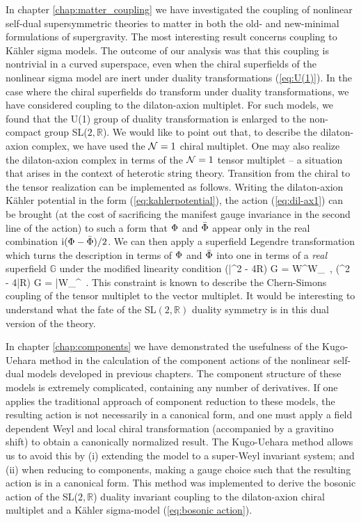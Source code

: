 In chapter \ref{chap:matter_coupling} we have investigated the coupling of nonlinear self-dual supersymmetric theories to matter in both the old- and new-minimal formulations of supergravity. The most interesting result concerns coupling to K{\"a}hler sigma models. The outcome of our analysis was that this coupling is nontrivial in a curved superspace, even when the chiral superfields of the nonlinear sigma model are inert under duality transformations (\ref{eq:U(1)}). In the case where the chiral superfields do transform under duality transformations, we have considered coupling to the dilaton-axion multiplet. For such models, we found that the U(1) group of duality transformation is enlarged to the non-compact group SL($2,{\mathbb R}$). We would like to point out that, to describe the dilaton-axion complex, we have used the ${\cal N}=1$ chiral multiplet. One may also realize the dilaton-axion complex in terms of the ${\cal N}=1$ tensor multiplet -- a situation that arises in the context of heterotic string theory. Transition from the chiral to the tensor realization can be implemented as follows. Writing the dilaton-axion K{\"a}hler potential in the form (\ref{eq:kahlerpotential}), the action (\ref{eq:dil-ax1}) can be brought (at the cost of sacrificing the manifest gauge invariance in the second line of the action) to such a form that  $\Phi$ and $\bar {\Phi}$ appear only in the real combination ${\rm i}(\Phi - \bar {\Phi})/2$. We can then apply a superfield Legendre transformation which turns the description in terms of $\Phi$ and $\bar {\Phi}$ into one in terms of a {\it real} superfield ${\mathbb G}$ under the modified linearity condition
\be
({\bar \cD}^2 - 4R) {\mathbb G} = W^\a W_\a~, \qquad
(\cD^2 - 4{\bar R}) {\mathbb G} = {\bar W}_^\ad~.
\ee
This constraint is known to describe the Chern-Simons coupling of the tensor multiplet to the vector multiplet. It would be interesting to understand what the fate of the SL$(2,{\mathbb R})$ duality symmetry is in this dual version of the theory.

In chapter \ref{chap:components} we have demonstrated the usefulness of the Kugo-Uehara method in the calculation of the component actions of the nonlinear self-dual models developed in previous chapters. The component structure of these models is extremely complicated, containing any number of derivatives. If one applies the traditional approach of component reduction to these models, the resulting action is not necessarily in a canonical form, and one must apply a field dependent Weyl and local chiral transformation (accompanied by a gravitino shift) to obtain a canonically normalized result. The Kugo-Uehara method allows us to avoid this by (i) extending the model to a super-Weyl invariant system; and (ii) when reducing to components, making a gauge choice such that the resulting action is in a canonical form. This method was implemented to derive the bosonic action of the SL($2,{\mathbb R}$) duality invariant coupling to the dilaton-axion chiral multiplet and a K{\"a}hler sigma-model (\ref{eq:bosonic action}).

